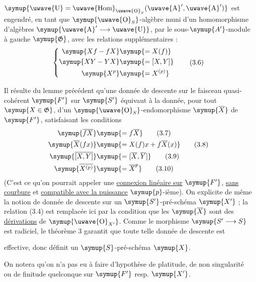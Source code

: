  $\symup{\text{\uwave{U}}=
\mathop{\text{\uwave{Hom}}}\nolimits_{\text{\uwave{O}}_S}(\text{\uwave{A}}',\text{\uwave{A}}')}$ est engendré, en
tant que $\symup{\text{\uwave{O}}_S}$-algèbre muni d'un homomorphisme d'algèbres
$\symup{\text{\uwave{A}}'\longrightarrow\text{\uwave{U}}}$, par le sous-$\symup{A'}$-module à
gauche $\symup{\mathfrak G}$, avec les relations supplémentaires :
\begin{equation}
  \left\{
  \begin{aligned}\symup{Xf-fX}&\symup{=X(f)}\\\symup{XY-YX}&\symup{=[X,Y]}\\\symup{X^p}&\symup{=X^{(p)}}\end{aligned}
  \right.
  \tag{3.6}
\end{equation}

Il résulte du lemme précédent qu'une donnée de descente sur le faisceau
quasi-cohérent $\symup{F'}$ sur $\symup{S'}$ équivaut à la donnée, pour tout $\symup{X\in\mathfrak G}$,
d'un $\symup{\text{\uwave{O}}_S}$-endomorphisme $\symup{\overline X}$ de $\symup{F'}$, satisfaisant les
conditions
\begin{align}
  \symup{\overline{fX}}&\symup{=f\overline X} \tag{3.7}\\
  \symup{\overline X(fx)}&\symup{=X(f)x+f\overline X(x)} \tag{3.8}\\
  \symup{\overline{[X,Y]}}&\symup{=[\overline X,\overline Y]} \tag{3.9}\\
  \symup{\overline{X^{(p)}}}&\symup{=\overline X^p} \tag{3.10}
\end{align}
(C'est ce qu'on pourrait appeler une \uline{connexion linéaire sur} $\symup{F'}$, \uline{sans courbure} et \uline{compatible avec la puissance} $\symup{p}$-ième). On explicite de même la
notion de donnée de descente sur un $\symup{S'}$-pré-schéma $\symup{X'}$ ; la relation (3.4) est
remplacée ici par la condition que les $\symup{\overline X}$ sont des \uline{dérivations} de
$\symup{\text{\uwave{O}}_{X'}}$. Comme le morphisme $\symup{S'\longrightarrow S}$ est radiciel, le
théorème 3 garantit que toute telle donnée de descente est

effective, donc définit un $\symup{S}$-pré-schéma $\symup{X}$.

On notera qu'on n'a pas eu à faire d'hypothèse de platitude, de non singularité
ou de finitude quelconque sur $\symup{F'}$ resp. $\symup{X'}$.

